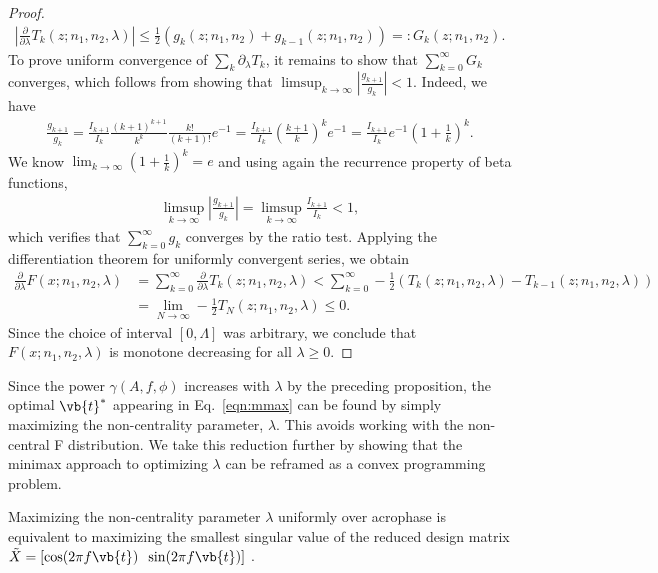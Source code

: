 \begin{proof}
\begin{align}
    \left|\frac{\partial}{\partial \lambda} T_k(z;n_1,n_2,\lambda) \right| \leq \frac{1}{2}\left( g_k(z;n_1,n_2) + g_{k-1}(z;n_1,n_2)\right) =: G_k(z;n_1,n_2).
\end{align}
To prove uniform convergence of $\sum_{k} \partial_\lambda T_k$, it remains to show that $\sum_{k=0}^\infty G_k$ converges, which follows from showing that $\limsup_{k\to\infty}  \left| \frac{g_{k+1}}{g_k}\right| <1$. Indeed, we have
\begin{align}
   \frac{g_{k+1}}{g_k} = \frac{I_{k+1}}{I_k}  \frac{(k+1)^{k+1}}{k^k} \frac{k!}{(k+1)!} e^{-1} =\frac{I_{k+1}}{I_k} \left( \frac{k+1}{k}\right)^k e^{-1} =  \frac{I_{k+1}}{I_k} e^{-1}\left(1+\frac{1}{k}\right)^k.
\end{align}
We know $\lim_{k\to\infty} \left( 1 + \frac{1}{k}\right)^k = e $ and using again the recurrence property of beta functions, 
\begin{align}
    \limsup_{k\to\infty}    \left| \frac{g_{k+1}}{g_k}\right|  =  \limsup_{k\to\infty} \frac{I_{k+1}}{I_k} < 1,
\end{align}
which verifies that $\sum_{k=0}^\infty g_k$ converges by the ratio test. Applying the differentiation theorem for uniformly convergent series, we obtain
\begin{align}
        \frac{\partial }{\partial \lambda} F(x;n_1,n_2,\lambda) &= \sum_{k=0}^\infty \frac{\partial}{\partial \lambda} T_k(z;n_1,n_2, \lambda) <\sum_{k=0}^\infty- \frac{1}{2}\left( T_k\left(z;n_1,n_2,\lambda\right)  - T_{k-1}\left(z;n_1,n_2,\lambda\right)  \right)\\
        &= \lim_{N\to\infty} -\frac{1}{2} T_N(z;n_1,n_2,\lambda) \leq 0.
    \end{align}
Since the choice of interval $[0,\Lambda]$ was arbitrary, we conclude that $F(x;n_1,n_2,\lambda)$ is monotone decreasing for all $\lambda \geq 0$.

\end{proof}
Since the power $\gamma(A,f,\phi)$ increases with $\lambda$ by the preceding proposition,  the optimal $\vb{t}^*$ appearing in Eq.~\eqref{eqn:mmax} can be found by simply maximizing the non-centrality parameter, $\lambda$. This avoids working with the non-central F distribution. We take this reduction further by showing that the minimax approach to optimizing $\lambda$ can be reframed as a convex programming problem.
\begin{prop}
   Maximizing the non-centrality parameter $\lambda$ uniformly over acrophase is equivalent to maximizing the smallest singular value of the reduced design matrix $\tilde{X} = [\cos(2\pi f \vb{t})\;\; \sin(2\pi f \vb{t}) ] $ .
\end{prop} 
